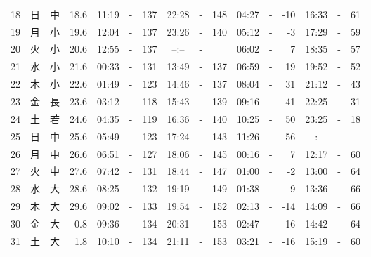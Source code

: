 \documentclass[12pt.a4j]{jsarticle}
\begin{document}
\begin{center}
\begin{table}[ht]
\begin{tabular}{|rc|cr|ccrccr|ccrccr|}
18 & 日 & 中 & 18.6 &  11:19 &-& 137  &  22:28 &-& 148  &   04:27 &-& -10  &   16:33 &-&  61  \\
19 & 月 & 小 & 19.6 &  12:04 &-& 137  &  23:26 &-& 140  &   05:12 &-&  -3  &   17:29 &-&  59  \\
20 & 火 & 小 & 20.6 &  12:55 &-& 137  &  --:-- &-&     &   06:02 &-&   7  &   18:35 &-&  57  \\
21 & 水 & 小 & 21.6 &  00:33 &-& 131  &  13:49 &-& 137  &   06:59 &-&  19  &   19:52 &-&  52  \\
22 & 木 & 小 & 22.6 &  01:49 &-& 123  &  14:46 &-& 137  &   08:04 &-&  31  &   21:12 &-&  43  \\
23 & 金 & 長 & 23.6 &  03:12 &-& 118  &  15:43 &-& 139  &   09:16 &-&  41  &   22:25 &-&  31  \\
24 & 土 & 若 & 24.6 &  04:35 &-& 119  &  16:36 &-& 140  &   10:25 &-&  50  &   23:25 &-&  18  \\
25 & 日 & 中 & 25.6 &  05:49 &-& 123  &  17:24 &-& 143  &   11:26 &-&  56  &   --:-- &-&     \\
26 & 月 & 中 & 26.6 &  06:51 &-& 127  &  18:06 &-& 145  &   00:16 &-&   7  &   12:17 &-&  60  \\
27 & 火 & 中 & 27.6 &  07:42 &-& 131  &  18:44 &-& 147  &   01:00 &-&  -2  &   13:00 &-&  64  \\
28 & 水 & 大 & 28.6 &  08:25 &-& 132  &  19:19 &-& 149  &   01:38 &-&  -9  &   13:36 &-&  66  \\
29 & 木 & 大 & 29.6 &  09:02 &-& 133  &  19:54 &-& 152  &   02:13 &-& -14  &   14:09 &-&  66  \\
30 & 金 & 大 &  0.8 &  09:36 &-& 134  &  20:31 &-& 153  &   02:47 &-& -16  &   14:42 &-&  64  \\
31 & 土 & 大 &  1.8 &  10:10 &-& 134  &  21:11 &-& 153  &   03:21 &-& -16  &   15:19 &-&  60  \\
   \hline
   \end{tabular}
\end{table}
\newpage
\end{center}
\end{document}
